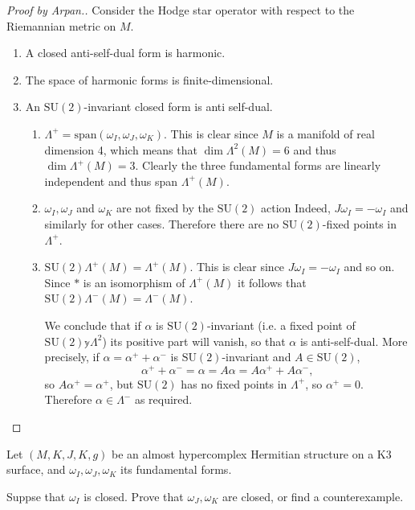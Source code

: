 \begin{proof}[Proof by Arpan.]
Consider the Hodge star operator with respect to the Riemannian metric on $M$.
\begin{enumerate}
\item A closed anti-self-dual form is harmonic. 
\item The space of harmonic forms is finite-dimensional.
\item An $\text{SU}(2)$-invariant closed form is
anti self-dual.
\begin{enumerate}
\item $\Lambda^+=\text{span}(\omega_I,\omega_J,\omega_K)$.
This is clear since $M$ is a manifold of real dimension 4,
which means that $\dim\Lambda^2(M)=6$ and thus
$\dim\Lambda^+(M)=3$. Clearly the three fundamental forms
are linearly independent and thus span $\Lambda^+(M)$.
\item $\omega_I,\omega_J$ and $\omega_K$ are not fixed by the
$\text{SU}(2)$ action
Indeed, $J\omega_I=-\omega_I$ and similarly
for other cases. Therefore there are no $\text{SU}(2)$-fixed
points in $\Lambda^+$.

\item $\text{SU}(2)\Lambda^+(M)=\Lambda^+(M)$.
This is clear since $J\omega_I = -\omega_I$ and so on.
Since $*$ is an isomorphism of $\Lambda^+(M)$ it follows that
$\text{SU}(2)\Lambda^-(M)=\Lambda^-(M)$.

\medskip\noindent
We conclude that if $\alpha$ is $\text{SU}(2)$-invariant (i.e. a fixed point of
$\text{SU}(2)\mathbb{y}\Lambda^2$) its positive part will vanish, so that
$\alpha$ is anti-self-dual. More precisely, if
$\alpha = \alpha^+ +\alpha^-$ is
$\text{SU}(2)$-invariant and $A \in \text{SU}(2)$,
$$
\alpha^+ +\alpha^- = \alpha = A\alpha=A\alpha^+ + A\alpha^-,
$$
so $A\alpha^+=\alpha^+$, but $\text{SU}(2)$ 
has no fixed points in $\Lambda^+$, so $\alpha^+=0$.
Therefore $\alpha \in \Lambda^-$ as required.
\end{enumerate}
\end{enumerate}
\end{proof}

\begin{exercise}
\label{exercise-closed-fundamental-forms-on-almost-hypercomplex-manifold}
Let $(M,K,J,K,g)$ be an almost hypercomplex Hermitian structure
on a K3 surface, and $\omega_I, \omega_J, \omega_K$
its fundamental forms.

Suppse that $\omega_I$ is closed.
Prove that $\omega_J,\omega_K$ are closed, or find a counterexample.
\end{exercise}

